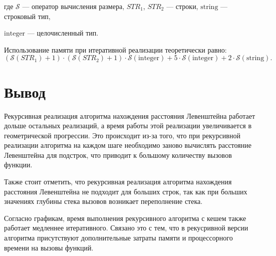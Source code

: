 \noindent где $\mathcal{S}$ — оператор вычисления размера, $STR_1$, $STR_2$ — строки, $\mathrm{string}$ — строковый тип,

\noindent $\mathrm{integer}$ — целочисленный тип.

Использование памяти при итеративной реализации теоретически равно:
\begin{equation}
(\mathcal{S}(STR_1) + 1) \cdot (\mathcal{S}(STR_2) + 1) \cdot \mathcal{S}\mathrm{(integer)} + 5\cdot \mathcal{S}\mathrm{(integer)} + 2 \cdot \mathcal{S}\mathrm{(string)}.
\end{equation}

\section*{Вывод}

Рекурсивная реализация алгоритма нахождения расстояния Левенштейна работает дольше остальных реализаций, а
время работы этой реализации увеличивается в геометрической прогрессии.
Это происходит из-за того, что при рекурсивной реализации алгоритма на каждом шаге необходимо заново вычислять расстояние Левенштейна для подстрок,
что приводит к большому количеству вызовов функции.

Также стоит отметить, что рекурсивная реализация алгоритма нахождения расстояния Левенштейна не подходит для больших строк,
так как при больших значениях глубины стека вызовов возникает переполнение стека.

Согласно графикам, время выполнения рекурсивного алгоритма с кешем также работает медленнее итеративного.
Связано это с тем, что в рекусривной версии алгоритма присутствуют дополнительные затраты памяти и процессорного времени на вызовы функций.
